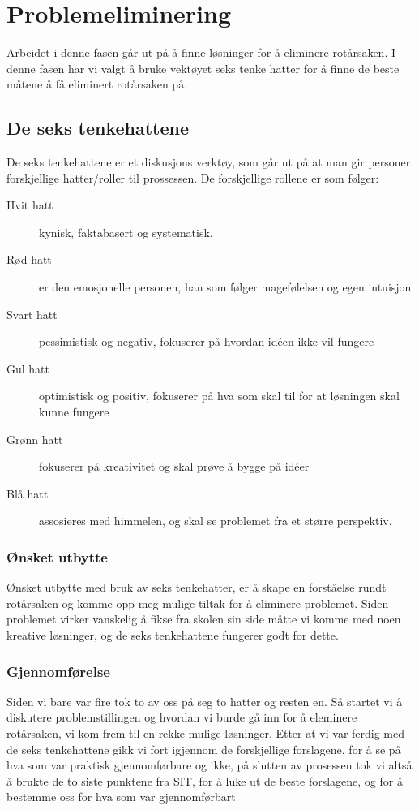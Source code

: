 \chapter{Problemeliminering}
Arbeidet i denne fasen går ut på å finne løsninger for å eliminere rotårsaken. I denne fasen har vi valgt å bruke vektøyet seks tenke hatter for å finne de beste måtene å få eliminert rotårsaken på.

\section{De seks tenkehattene}
De seks tenkehattene er et diskusjons verktøy, som går ut på at man gir personer forskjellige hatter/roller til prossessen. De forskjellige rollene er som følger:
\begin{description}
    \item [Hvit hatt] kynisk, faktabasert og systematisk.
    \item [Rød hatt] er den emosjonelle personen, han som følger magefølelsen og egen intuisjon
    \item[Svart hatt] pessimistisk og negativ, fokuserer på hvordan idéen ikke vil
    fungere
    \item [Gul hatt] optimistisk og positiv, fokuserer på hva som skal til for at løsningen skal kunne fungere
    \item[Grønn hatt] fokuserer på kreativitet og skal prøve å bygge på idéer
    \item[Blå hatt] assosieres med himmelen, og skal se problemet fra et større perspektiv.
\end{description}

\subsection{Ønsket utbytte}
Ønsket utbytte med bruk av seks tenkehatter, er å skape en forståelse rundt rotårsaken og komme opp meg mulige tiltak for å eliminere problemet. Siden problemet virker vanskelig å fikse fra skolen sin side måtte vi komme med noen kreative løsninger, og de seks tenkehattene fungerer godt for dette.

\subsection{Gjennomførelse}
Siden vi bare var fire tok to av oss på seg to hatter og resten en. Så startet vi å diskutere problemstillingen og hvordan vi burde gå inn for å eleminere rotårsaken, vi kom frem til en rekke mulige løsninger. Etter at vi var ferdig med de seks tenkehattene gikk vi fort igjennom de forskjellige forslagene, for å se på hva som var praktisk gjennomførbare og ikke, på slutten av prosessen tok vi altså å brukte de to siste punktene fra SIT, for å luke ut de beste forslagene, og for å bestemme oss for hva som var gjennomførbart

